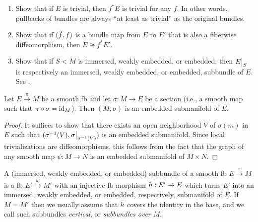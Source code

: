 \begin{xca}\label{example 2.7.3 RS1}
\begin{enumerate}
    \item Show that if $E$ is trivial, then $f^\ast E$ is trivial for any $f$. In other words, pullbacks of bundles are always ``at least as trivial'' as the original bundles.
    \item Show that if $(\wt{f},f)$ is a bundle map from $E$ to $E'$ that is also a fiberwise diffeomorphism, then $E\cong f^\ast E'$.
    \item Show that if $S<M$ is immersed, weakly embedded, or embedded, then $\restr{E}{S}$ is respectively an immersed, weakly embedded, or embedded, subbundle of $E$. See \cite[Example~2.7.3]{RS1}.
\end{enumerate}
\end{xca}



\begin{prop}
    Let $E\overset{\pi}{\to}M$ be a smooth \gls{fb} and let $\sigma:M\to E$ be a section (i.e., a smooth map such that $\pi\circ\sigma=\operatorname{id}_M$). Then $(M,\sigma)$ is an embedded submanifold of $E$.
\end{prop}
\begin{proof}
    It suffices to show that there exists an open neighborhood $V$ of $\sigma(m)$ in $E$ such that $(\sigma^{-1}(V),\restr{\sigma}{\sigma^{-1}(V)})$ is an embedded submanifold. Since local trivializations are diffeomorphisms, this follows from the fact that the graph of any smooth map $\psi:M\to N$ is an embedded submanifold of $M\times N$.
\end{proof}



\begin{defn}
    A (immersed, weakly embedded, or embedded) subbundle of a smooth \gls{fb} $E\overset{\pi}{\to}M$ is a \gls{fb} $E'\overset{\pi'}{\to}M'$ with an injective \gls{fb} morphism $\wt{h}:E'\to E$ which turns $E'$ into an immersed, weakly embedded, or embedded, respectively, submanifold of $E$. If $M=M'$ then we usually assume that $\wt{h}$ covers the identity in the base, and we call such subbundles \emph{vertical}, or \emph{subbundles over $M$}. 
\end{defn}

